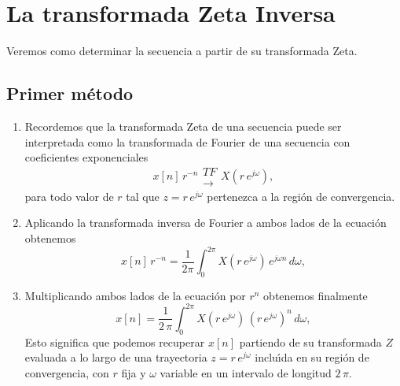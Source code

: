 \section{La transformada Zeta Inversa}

Veremos como determinar la secuencia a partir de su transformada Zeta.

\subsection{Primer m\'{e}todo}

\begin{enumerate}
        \item   Recordemos que la transformada Zeta de una secuencia puede ser interpretada como la 
          transformada de Fourier de una secuencia con coeficientes exponenciales
        \begin{equation}
                x[n] \, r^{-n}
                \begin{array}{l}
                        TF              \\
                        \rightarrow
                \end{array}
                X \left( r \, e^{j \omega} \right),
        \end{equation}
        para todo valor de $r$ tal que $z = r \, e^{j \omega}$ pertenezca a la regi\'{o}n de convergencia.
        
        \item   Aplicando la transformada inversa de Fourier a ambos lados de la ecuaci\'{o}n obtenemos
        \begin{equation}
                x[n] \, r^{-n} = \frac{1}{2 \pi} \int^{2 \pi}_{0} X( r \, e^{j \omega}) \, e^{j \omega n} \, d \omega,
        \end{equation}
        
        \item   Multiplicando ambos lados de la ecuaci\'{o}n por $r^{n}$ obtenemos finalmente 
        \begin{equation} \label{zetaanalisis}
                x[n] = \frac{1}{2 \, \pi} \int^{2 \pi}_{0} X( r \, e^{j \omega}) \, (r \, e^{j \omega})^{n} \, d \omega,
        \end{equation}
        Esto significa que podemos recuperar $x[n]$ partiendo de su transformada $Z$ evaluada a lo largo
        de una trayectoria $z=r \, e^{j \omega}$ inclu\'{\i}da en su regi\'{o}n de convergencia, con $r$ fija
        y $\omega$ variable en un intervalo de longitud $2 \, \pi$.


\end{enumerate}
